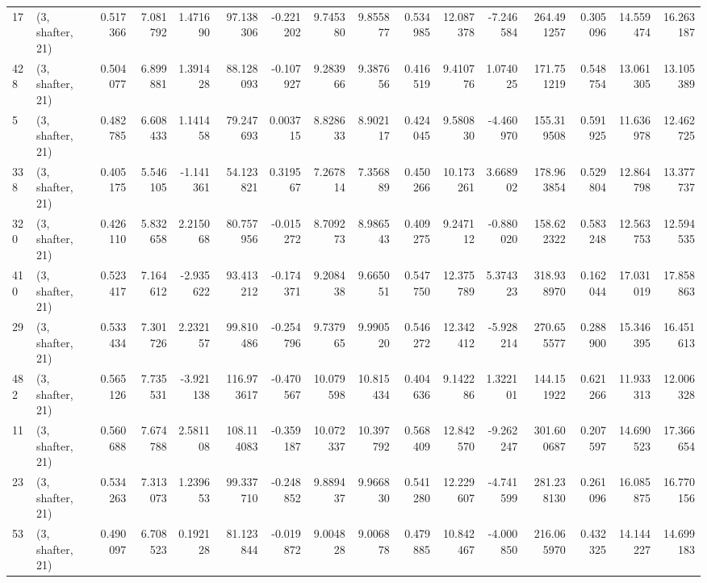 \begin{tabular}{llrrrrrrrrrrrrrr}
17  &  (3, shafter, 21) &   0.517366 &   7.081792 &   1.471690 &    97.138306 &  -0.221202 &   9.745380 &   9.855877 &  0.534985 &  12.087378 &  -7.246584 &    264.491257 &    0.305096 &   14.559474 &   16.263187 \\
428 &  (3, shafter, 21) &   0.504077 &   6.899881 &   1.391428 &    88.128093 &  -0.107927 &   9.283966 &   9.387656 &  0.416519 &   9.410776 &   1.074025 &    171.751219 &    0.548754 &   13.061305 &   13.105389 \\
5   &  (3, shafter, 21) &   0.482785 &   6.608433 &   1.141458 &    79.247693 &   0.003715 &   8.828633 &   8.902117 &  0.424045 &   9.580830 &  -4.460970 &    155.319508 &    0.591925 &   11.636978 &   12.462725 \\
338 &  (3, shafter, 21) &   0.405175 &   5.546105 &  -1.141361 &    54.123821 &   0.319567 &   7.267814 &   7.356889 &  0.450266 &  10.173261 &   3.668902 &    178.963854 &    0.529804 &   12.864798 &   13.377737 \\
320 &  (3, shafter, 21) &   0.426110 &   5.832658 &   2.215068 &    80.757956 &  -0.015272 &   8.709273 &   8.986543 &  0.409275 &   9.247112 &  -0.880020 &    158.622322 &    0.583248 &   12.563753 &   12.594535 \\
410 &  (3, shafter, 21) &   0.523417 &   7.164612 &  -2.935622 &    93.413212 &  -0.174371 &   9.208438 &   9.665051 &  0.547750 &  12.375789 &   5.374323 &    318.938970 &    0.162044 &   17.031019 &   17.858863 \\
29  &  (3, shafter, 21) &   0.533434 &   7.301726 &   2.232157 &    99.810486 &  -0.254796 &   9.737965 &   9.990520 &  0.546272 &  12.342412 &  -5.928214 &    270.655577 &    0.288900 &   15.346395 &   16.451613 \\
482 &  (3, shafter, 21) &   0.565126 &   7.735531 &  -3.921138 &   116.973617 &  -0.470567 &  10.079598 &  10.815434 &  0.404636 &   9.142286 &   1.322101 &    144.151922 &    0.621266 &   11.933313 &   12.006328 \\
11  &  (3, shafter, 21) &   0.560688 &   7.674788 &   2.581108 &   108.114083 &  -0.359187 &  10.072337 &  10.397792 &  0.568409 &  12.842570 &  -9.262247 &    301.600687 &    0.207597 &   14.690523 &   17.366654 \\
23  &  (3, shafter, 21) &   0.534263 &   7.313073 &   1.239653 &    99.337710 &  -0.248852 &   9.889437 &   9.966830 &  0.541280 &  12.229607 &  -4.741599 &    281.238130 &    0.261096 &   16.085875 &   16.770156 \\
53  &  (3, shafter, 21) &   0.490097 &   6.708523 &   0.192128 &    81.123844 &  -0.019872 &   9.004828 &   9.006878 &  0.479885 &  10.842467 &  -4.000850 &    216.065970 &    0.432325 &   14.144227 &   14.699183 \\

\end{tabular}
